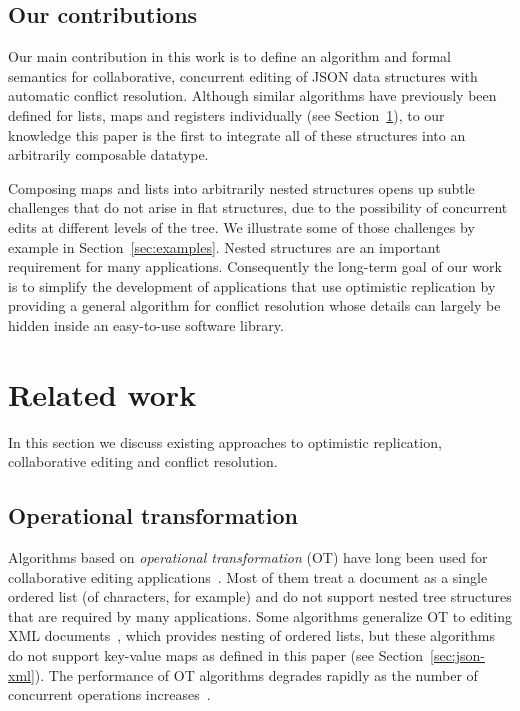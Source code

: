 \documentclass[10pt,journal,compsoc]{IEEEtran}
\begin{document}
\subsection{Our contributions}

Our main contribution in this work is to define an algorithm and formal semantics for collaborative, concurrent editing of JSON data structures with automatic conflict resolution. Although similar algorithms have previously been defined for lists, maps and registers individually (see Section~\ref{sec:related}), to our knowledge this paper is the first to integrate all of these structures into an arbitrarily composable datatype.

Composing maps and lists into arbitrarily nested structures opens up subtle challenges that do not arise in flat structures, due to the possibility of concurrent edits at different levels of the tree. We illustrate some of those challenges by example in Section~\ref{sec:examples}. Nested structures are an important requirement for many applications.
Consequently the long-term goal of our work is to simplify the development of applications that use optimistic replication by providing a general algorithm for conflict resolution whose details can largely be hidden inside an easy-to-use software library.

\section{Related work}\label{sec:related}

In this section we discuss existing approaches to optimistic replication, collaborative editing and conflict resolution.

\subsection{Operational transformation}\label{sec:related-ot}

Algorithms based on \emph{operational transformation} (OT) have long been used for collaborative editing applications~\cite{Ellis:1989ue,Ressel:1996wx,Sun:1998vf,Nichols:1995fd}. Most of them treat a document as a single ordered list (of characters, for example) and do not support nested tree structures that are required by many applications. Some algorithms generalize OT to editing XML documents~\cite{Davis:2002iv,Ignat:2003jy,Wang:2015vo}, which provides nesting of ordered lists, but these algorithms do not support key-value maps as defined in this paper (see Section~\ref{sec:json-xml}). The performance of OT algorithms degrades rapidly as the number of concurrent operations increases~\cite{Li:2006kd}.
\end{document}

